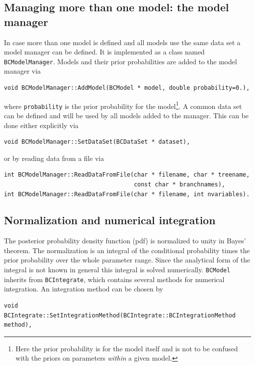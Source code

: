 \documentclass[11pt, a4paper]{article}
\newcommand{\code}[1]{\texttt{#1}}
\begin{document}
\subsection{Managing more than one model: the model manager}
\label{subsection:modelmanager}

In case more than one model is defined and all models use the same
data set a model manager can be defined. It is implemented as a class
named \verb|BCModelManager|. Models and their prior probabilities are
added to the model manager via
%
\begin{verbatim}
void BCModelManager::AddModel(BCModel * model, double probability=0.),
\end{verbatim}
%
where \verb|probability| is the prior probability for the model\footnote{Here
  the prior probability is for the model itself and is not to be confused with
  the priors on parameters \emph{within} a given model.}. A common data set can
be defined and will be used by all models added to the manager. This can be done
either explicitly via
%
\begin{verbatim}
void BCModelManager::SetDataSet(BCDataSet * dataset),
\end{verbatim}
%
or by reading data from a file via
%
\begin{verbatim}
int BCModelManager::ReadDataFromFile(char * filename, char * treename,
                                     const char * branchnames),
int BCModelManager::ReadDataFromFile(char * filename, int nvariables).
\end{verbatim}


\subsection{Normalization and numerical integration}
\label{section:normalization}

The posterior probability density function (pdf) is normalized to
unity in Bayes' theorem. The normalization is an integral of the
conditional probability times the prior probability over the whole
parameter range. Since the analytical form of the integral is not
known in general this integral is solved numerically. \code{BCModel}
inherits from \code{BCIntegrate}, which contains several methods for
numerical integration. An integration method can be chosen by
%
\begin{verbatim}
void BCIntegrate::SetIntegrationMethod(BCIntegrate::BCIntegrationMethod method),
\end{verbatim}
\end{document}
